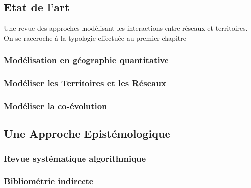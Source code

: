 


\subsection{Etat de l'art}

Une revue des approches modélisant les interactions entre réseaux et territoires. On se raccroche à la typologie effectuée au premier chapitre

\subsubsection{Modélisation en géographie quantitative}

\subsubsection{Modéliser les Territoires et les Réseaux}


\subsubsection{Modéliser la co-évolution}





\subsection{Une Approche Epistémologique}


\subsubsection{Revue systématique algorithmique}



\subsubsection{Bibliométrie indirecte}



